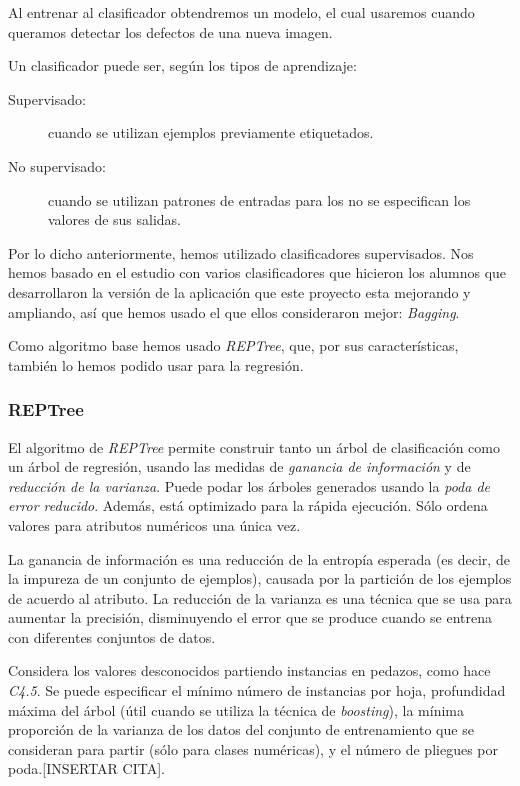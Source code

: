 Al entrenar al clasificador obtendremos un modelo, el cual usaremos cuando queramos detectar los defectos de una nueva imagen.

Un clasificador puede ser, según los tipos de aprendizaje:

\begin{description}
\item[Supervisado:] cuando se utilizan ejemplos previamente etiquetados.
\item[No supervisado:] cuando se utilizan patrones de entradas para los no se especifican los valores
de sus salidas.
\end{description}

Por lo dicho anteriormente, hemos utilizado clasificadores supervisados. Nos hemos basado en el estudio con varios clasificadores que hicieron los alumnos que desarrollaron la versión de la aplicación que este proyecto esta mejorando y ampliando, así que hemos usado el que ellos consideraron mejor: \textit{Bagging}.

Como algoritmo base hemos usado \textit{REPTree}, que, por sus características, también lo hemos podido usar para la regresión.

\subsubsection{REPTree}
El algoritmo de \textit{REPTree} permite construir tanto un árbol de clasificación como un árbol de regresión, usando las medidas de \textit{ganancia de información} y de \textit{reducción de la varianza}. Puede podar los árboles generados usando la \textit{poda de error reducido}. Además, está optimizado para la rápida ejecución. Sólo ordena valores para atributos numéricos una única vez.

La ganancia de información es una reducción de la entropía esperada (es decir, de la impureza de un conjunto de ejemplos), causada por la partición de los ejemplos de acuerdo al atributo. La reducción de la varianza es una técnica que se usa para aumentar la precisión, disminuyendo el error que se produce cuando se entrena con diferentes conjuntos de datos.

Considera los valores desconocidos partiendo instancias en pedazos, como hace \textit{C4.5}. Se puede especificar el mínimo número de instancias por hoja, profundidad máxima del árbol (útil cuando se utiliza la técnica de \textit{boosting}), la mínima proporción de la varianza de los datos del conjunto de entrenamiento que se consideran para partir (sólo para clases numéricas), y el número de pliegues por poda.[INSERTAR CITA].

